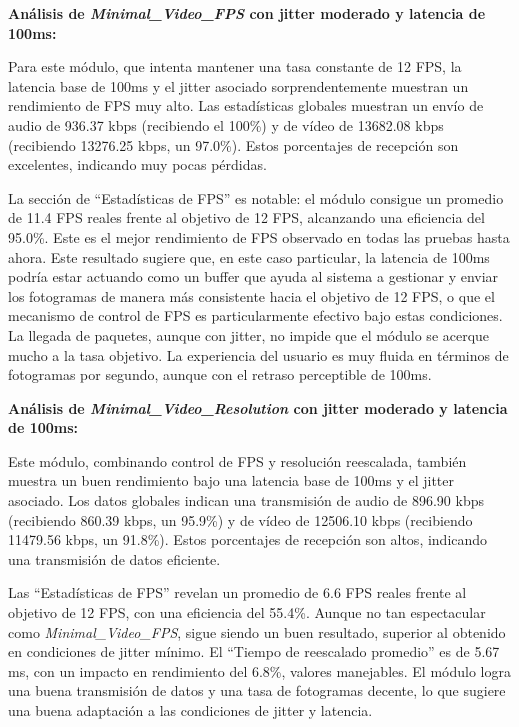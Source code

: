 \vspace{\baselineskip}

\textbf{Análisis de \textit{Minimal\_Video\_FPS} con jitter moderado y latencia de 100ms:}
\vspace{\baselineskip}

Para este módulo, que intenta mantener una tasa constante de 12 FPS, la latencia base de 100ms y el jitter asociado sorprendentemente muestran un rendimiento de FPS muy alto. Las estadísticas globales muestran un envío de audio de 936.37 kbps (recibiendo el 100\%) y de vídeo de 13682.08 kbps (recibiendo 13276.25 kbps, un 97.0\%). Estos porcentajes de recepción son excelentes, indicando muy pocas pérdidas.
\vspace{\baselineskip}

La sección de ``Estadísticas de FPS'' es notable: el módulo consigue un promedio de 11.4 FPS reales frente al objetivo de 12 FPS, alcanzando una eficiencia del 95.0\%. Este es el mejor rendimiento de FPS observado en todas las pruebas hasta ahora. Este resultado sugiere que, en este caso particular, la latencia de 100ms podría estar actuando como un buffer que ayuda al sistema a gestionar y enviar los fotogramas de manera más consistente hacia el objetivo de 12 FPS, o que el mecanismo de control de FPS es particularmente efectivo bajo estas condiciones. La llegada de paquetes, aunque con jitter, no impide que el módulo se acerque mucho a la tasa objetivo. La experiencia del usuario es muy fluida en términos de fotogramas por segundo, aunque con el retraso perceptible de 100ms.

\vspace{\baselineskip}

\textbf{Análisis de \textit{Minimal\_Video\_Resolution} con jitter moderado y latencia de 100ms:}
\vspace{\baselineskip}

Este módulo, combinando control de FPS y resolución reescalada, también muestra un buen rendimiento bajo una latencia base de 100ms y el jitter asociado. Los datos globales indican una transmisión de audio de 896.90 kbps (recibiendo 860.39 kbps, un 95.9\%) y de vídeo de 12506.10 kbps (recibiendo 11479.56 kbps, un 91.8\%). Estos porcentajes de recepción son altos, indicando una transmisión de datos eficiente.
\vspace{\baselineskip}

Las ``Estadísticas de FPS'' revelan un promedio de 6.6 FPS reales frente al objetivo de 12 FPS, con una eficiencia del 55.4\%. Aunque no tan espectacular como \textit{Minimal\_Video\_FPS}, sigue siendo un buen resultado, superior al obtenido en condiciones de jitter mínimo. El ``Tiempo de reescalado promedio'' es de 5.67 ms, con un impacto en rendimiento del 6.8\%, valores manejables. El módulo logra una buena transmisión de datos y una tasa de fotogramas decente, lo que sugiere una buena adaptación a las condiciones de jitter y latencia.

